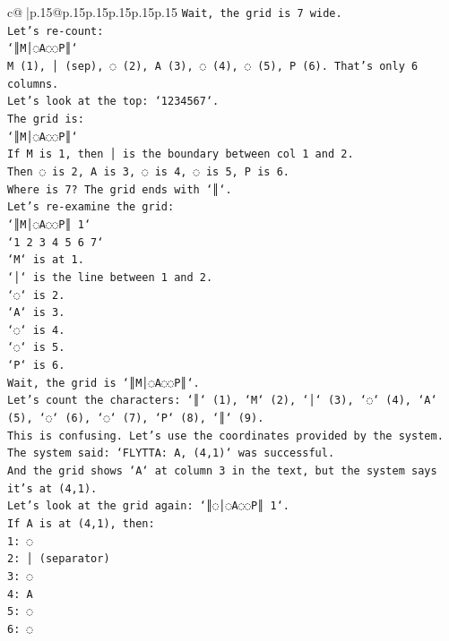 \documentclass{article}
\begin{document}
{\begin{supertabular}{c@{$\;$}|p{.15\linewidth}@{}p{.15\linewidth}p{.15\linewidth}p{.15\linewidth}p{.15\linewidth}p{.15\linewidth}}
{{{\texttt{Wait, the grid is 7 wide.} \\
\texttt{Let's re{-}count:} \\
\texttt{`║M│◌A◌◌P║`} \\
\texttt{M (1), │ (sep), ◌ (2), A (3), ◌ (4), ◌ (5), P (6). That's only 6 columns.} \\
\texttt{Let's look at the top: `1234567`.} \\
\texttt{The grid is:} \\
\texttt{`║M│◌A◌◌P║`} \\
\texttt{If M is 1, then │ is the boundary between col 1 and 2.} \\
\texttt{Then ◌ is 2, A is 3, ◌ is 4, ◌ is 5, P is 6.} \\
\texttt{Where is 7? The grid ends with `║`.} \\
\texttt{Let's re{-}examine the grid:} \\
\texttt{`║M│◌A◌◌P║ 1`} \\
\texttt{`1 2 3 4 5 6 7`} \\
\texttt{`M` is at 1.} \\
\texttt{`│` is the line between 1 and 2.} \\
\texttt{`◌` is 2.} \\
\texttt{`A` is 3.} \\
\texttt{`◌` is 4.} \\
\texttt{`◌` is 5.} \\
\texttt{`P` is 6.} \\
\texttt{Wait, the grid is `║M│◌A◌◌P║`.} \\
\texttt{Let's count the characters: `║` (1), `M` (2), `│` (3), `◌` (4), `A` (5), `◌` (6), `◌` (7), `P` (8), `║` (9).} \\
\texttt{This is confusing. Let's use the coordinates provided by the system.} \\
\texttt{The system said: `FLYTTA: A, (4,1)` was successful.} \\
\texttt{And the grid shows `A` at column 3 in the text, but the system says it's at (4,1).} \\
\texttt{Let's look at the grid again: `║◌│◌A◌◌P║ 1`.} \\
\texttt{If A is at (4,1), then:} \\
\texttt{1: ◌} \\
\texttt{2: │ (separator)} \\
\texttt{3: ◌} \\
\texttt{4: A} \\
\texttt{5: ◌} \\
\texttt{6: ◌} \\
}}}
\end{supertabular}}
\end{document}
